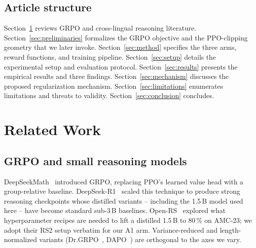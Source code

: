 \documentclass[journal,onecolumn,11pt]{IEEEtran}
\newcommand{\armA}{\textsc{A1}}
\begin{document}
\subsection{Article structure}
Section~\ref{sec:related} reviews GRPO and cross-lingual reasoning literature.
Section~\ref{sec:preliminaries} formalizes the GRPO objective and the
PPO-clipping geometry that we later invoke. Section~\ref{sec:method} specifies
the three arms, reward functions, and training pipeline. Section~\ref{sec:setup}
details the experimental setup and evaluation protocol.
Section~\ref{sec:results} presents the empirical results and three findings.
Section~\ref{sec:mechanism} discusses the proposed regularization mechanism.
Section~\ref{sec:limitations} enumerates limitations and threats to validity.
Section~\ref{sec:conclusion} concludes.

\section{Related Work}
\label{sec:related}

\subsection{GRPO and small reasoning models}
DeepSeekMath~\cite{deepseekmath_2024} introduced GRPO, replacing PPO's learned
value head with a group-relative baseline. DeepSeek-R1~\cite{deepseekR1_2025}
scaled this technique to produce strong reasoning checkpoints whose distilled
variants -- including the 1.5\,B model used here -- have become standard
sub-3\,B baselines. Open-RS~\cite{openRS_2025} explored what hyperparameter
recipes are needed to lift a distilled 1.5\,B to 80\,\% on AMC-23; we adopt
their RS2 setup verbatim for our \armA{} arm. Variance-reduced and
length-normalized variants (Dr.GRPO~\cite{drgrpo_2025}, DAPO~\cite{dapo_2025})
are orthogonal to the axes we vary.
\end{document}
